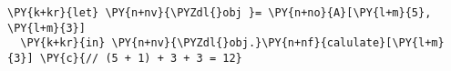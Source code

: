 \begin{Verbatim}[commandchars=\\\{\}]
\PY{k+kr}{let} \PY{n+nv}{\PYZdl{}obj }= \PY{n+no}{A}[\PY{l+m}{5}, \PY{l+m}{3}]
  \PY{k+kr}{in} \PY{n+nv}{\PYZdl{}obj.}\PY{n+nf}{calulate}[\PY{l+m}{3}] \PY{c}{// (5 + 1) + 3 + 3 = 12}
\end{Verbatim}
